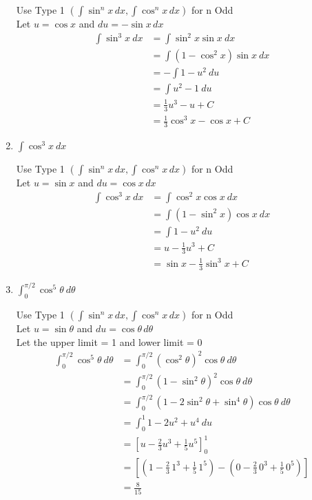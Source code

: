 \documentclass[12pt]{article}
\begin{document}
\begin{enumerate}
Use Type 1 $\left(\int \sin ^n x\,dx, \int \cos ^ n x\,dx\right)$ for n Odd \\
Let $u=\cos x$ and $du=-\sin x\,dx$
\begin{equation*}
  \begin{aligned}
  \int \sin ^3 x \ dx &= \int \sin ^2 x  \sin x \ dx \\
  &= \int (1-\cos ^2 x) \sin x \ dx \\
  &= -\int 1-u^2 \ du \\
  &= \int u^2-1 \ du \\
  &= \frac{1}{3}u^3 - u + C \\
  &= \frac{1}{3}\cos ^3 x - \cos x + C
  \end{aligned}
\end{equation*}

\item $\displaystyle\int \cos ^3 x \ dx $

Use Type 1 $\left(\int \sin ^n x\,dx, \int \cos ^ n x\,dx\right)$ for n Odd \\
Let $u=\sin x$ and $du=\cos x\,dx$
\begin{equation*}
  \begin{aligned}
  \int \cos ^3 x \ dx &= \int \cos ^2 x  \cos x \ dx \\
  &= \int (1-\sin ^2 x) \cos x \ dx \\
  &= \int 1-u^2 \ du \\
  &= u - \frac{1}{3}u^3 + C \\
  &= \sin x - \frac{1}{3}\sin ^3 x + C
  \end{aligned}
\end{equation*}

\item $\displaystyle\int_0^{\pi/2} \cos ^5 \theta \ d\theta$

Use Type 1 $\left(\int \sin ^n x\,dx, \int \cos ^ n x\,dx\right)$ for n Odd \\
Let $u=\sin \theta$ and $du=\cos \theta\,d\theta$ \\
Let the upper limit = 1 and lower limit = 0
\begin{equation*}
  \begin{aligned}
  \int_0^{\pi/2} \cos ^5 \theta \ d\theta &= \int_0^{\pi/2} (\cos ^2 \theta)^2 \cos \theta \ d\theta \\
  &= \int_0^{\pi/2} (1-\sin ^2 \theta)^2 \cos \theta \ d\theta \\
  &= \int_0^{\pi/2} (1-2\sin ^2 \theta + \sin ^4 \theta) \cos \theta \ d\theta \\
  &= \int_0^1 1-2u^2+u^4 \ du \\
  &= \left[u-\frac{2}{3}u^3+\frac{1}{5}u^5\right]_0^1 \\ 
  &= \left[\left(1-\frac{2}{3}\,1^3+\frac{1}{5}\,1^5\right) - \left(0-\frac{2}{3}\,0^3+\frac{1}{5}\,0^5\right)\right] \\
  &= \frac{8}{15}
  \end{aligned}
\end{equation*}


\end{enumerate}
\end{document}
